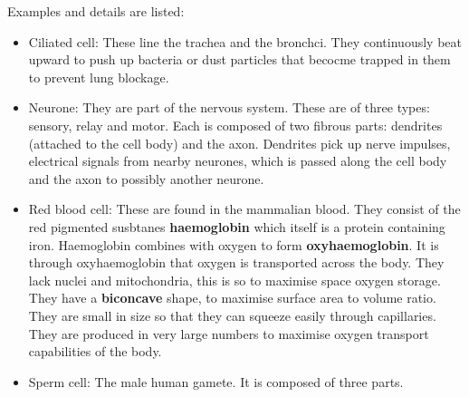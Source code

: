 \documentclass[twocolumn]{article}
\begin{document}
Examples and details are listed:
\begin{itemize}
	\item Ciliated cell: These line the trachea and the bronchci. They continuously beat 
		upward to push up bacteria or dust particles that becocme trapped in them to prevent
		lung blockage.
	\item Neurone:  They are part of the nervous system. These are of three types: 
		sensory, relay and motor. Each is composed of two fibrous parts: dendrites 
		(attached to the cell body) and the axon. Dendrites pick up nerve impulses, 
		electrical signals from nearby neurones, which is passed along the cell body and 
		the axon to possibly another neurone.
	\item Red blood cell: These are found in the mammalian blood. They consist of the red
		pigmented susbtanes \textbf{haemoglobin} which itself is a protein containing 
		iron. Haemoglobin combines with oxygen to form \textbf{oxyhaemoglobin}. It is
		through oxyhaemoglobin that oxygen is transported across the body. They lack
		nuclei and mitochondria, this is so to maximise space oxygen storage. They have
		a \textbf{biconcave} shape, to maximise surface area to volume ratio. They are
		small in size so that they can squeeze easily through capillaries. They are 
		produced in very large numbers to maximise oxygen transport capabilities of the
		body.
	\item Sperm cell: The male human gamete. It is composed of three parts.
	
\end{itemize}
\end{document}
